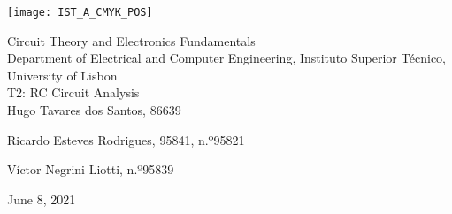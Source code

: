 
\thispagestyle {empty}

\texttt{[image: IST\_A\_CMYK\_POS]}

\begin{center}
%
\vspace{1.0cm}

\vspace{1cm}
{\FontLb Circuit Theory and Electronics Fundamentals} \\ %
\vspace{1cm}
{\FontSn Department of Electrical and Computer Engineering, Instituto Superior Técnico, University of Lisbon} \\ %
\vspace{1cm}
{\FontSn T2: RC Circuit Analysis} \\
\vspace{1cm}
{\FontSn Hugo Tavares dos Santos, 86639}
\par{\FontSn Ricardo Esteves Rodrigues, 95841, n.º95821}
\par{\FontSn Víctor Negrini Liotti, n.º95839}
\vspace{1.0cm}




{\FontSn June 8, 2021} \\ %
%
\end{center}

